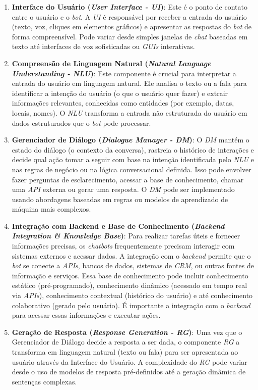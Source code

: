 \begin{enumerate}
\item \textbf{Interface do Usuário (\textit{User Interface - UI})}: Este é o
ponto de contato entre o usuário e o \textit{bot}. A \textit{UI} é responsável
por receber a entrada do usuário (texto, voz, cliques em elementos gráficos) e
apresentar as respostas do \textit{bot} de forma compreensível. Pode variar
desde simples janelas de \textit{chat} baseadas em texto até interfaces de voz
sofisticadas ou \textit{GUIs} interativas.
\item \textbf{Compreensão de Linguagem Natural (\textit{Natural Language
Understanding - NLU})}: Este componente é crucial para interpretar a entrada do
usuário em linguagem natural. Ele analisa o texto ou a fala para identificar a
intenção do usuário (o que o usuário quer fazer) e extrair informações
relevantes, conhecidas como entidades (por exemplo, datas, locais, nomes). O
\textit{NLU} transforma a entrada não estruturada do usuário em dados
estruturados que o \textit{bot} pode processar.
\item \textbf{Gerenciador de Diálogo (\textit{Dialogue Manager - DM})}: O
\textit{DM} mantém o estado do diálogo (o contexto da conversa), rastreia o
histórico de interações e decide qual ação tomar a seguir com base na intenção
identificada pelo \textit{NLU} e nas regras de negócio ou na lógica
conversacional definida. Isso pode envolver fazer perguntas de esclarecimento,
acessar a base de conhecimento, chamar uma \textit{API} externa ou gerar uma
resposta. O \textit{DM} pode ser implementado usando abordagens baseadas em
regras ou modelos de aprendizado de máquina mais complexos.
\item \textbf{Integração com Backend e Base de Conhecimento (\textit{Backend
Integration \& Knowledge Base})}: Para realizar tarefas úteis e fornecer
informações precisas, os \textit{chatbots} frequentemente precisam interagir com
sistemas externos e acessar dados. A integração com o \textit{backend} permite
que o \textit{bot} se conecte a \textit{APIs}, bancos de dados, sistemas de
\textit{CRM}, ou outras fontes de informação e serviços.  Essa base de
conhecimento pode incluir conhecimento estático (pré-programado), conhecimento
dinâmico (acessado em tempo real via \textit{APIs}), conhecimento contextual
(histórico do usuário) e até conhecimento colaborativo (gerado pelo usuário). É
importante a integração com o \textit{backend} para acessar essas informações e
executar ações.
\item \textbf{Geração de Resposta (\textit{Response Generation - RG})}: Uma vez
que o Gerenciador de Diálogo decide a resposta a ser dada, o componente
\textit{RG} a transforma em linguagem natural (texto ou fala) para ser
apresentada ao usuário através da Interface do Usuário. A complexidade do
\textit{RG} pode variar desde o uso de modelos de resposta pré-definidos até a
geração dinâmica de sentenças complexas.
\end{enumerate}

